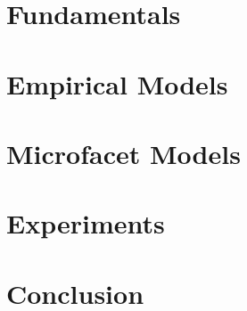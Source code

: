 \documentclass[11pt, a4paper,oneside]{book}
\begin{document}
	\chapter{Fundamentals}
	
	\chapter{Empirical Models}
	
	\chapter{Microfacet Models}
	
	\chapter{Experiments}
	
	\chapter{Conclusion}
	
 	\nocite{*}
	
	
	\printindex
\end{document}
